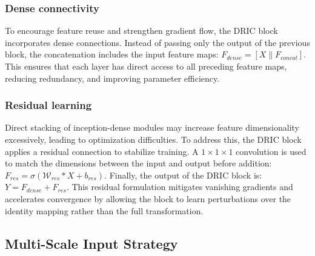 \subsubsection{Dense connectivity}

To encourage feature reuse and strengthen gradient flow, the DRIC block incorporates dense connections. Instead of passing only the output of the previous block, the concatenation includes the input feature maps: $F_{dense} =[X \| F_{concat}]$. This ensures that each layer has direct access to all preceding feature maps, reducing redundancy, and improving parameter efficiency.

\subsubsection{Residual learning}

Direct stacking of inception-dense modules may increase feature dimensionality excessively, leading to optimization difficulties. To address this, the DRIC block applies a residual connection to stabilize training. A $1\times 1\times 1$ convolution is used to match the dimensions between the input and output before addition: $F_{res} =\sigma (\mathcal W_{res} * X + b_{res})$. Finally, the output of the DRIC block is: $Y = F_{dense} +F_{res}$. This residual formulation mitigates vanishing gradients and accelerates convergence by allowing the block to learn perturbations over the identity mapping rather than the full transformation.

\subsection{Multi-Scale Input Strategy}

